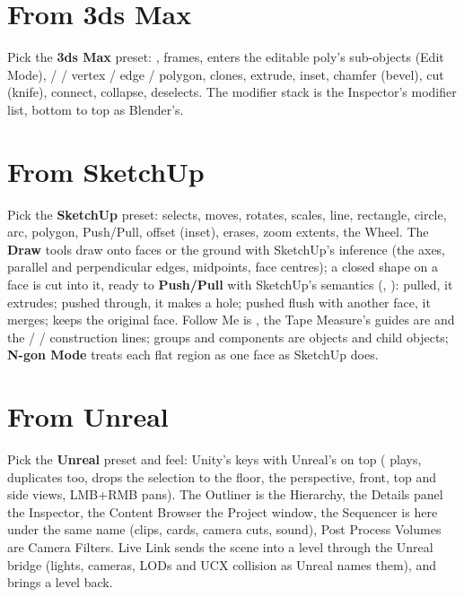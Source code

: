 \section{From 3ds Max}
Pick the \textbf{3ds Max} preset: ,  frames,  enters the editable poly's sub-objects (Edit
Mode),  /  /  vertex / edge / polygon,  clones,  extrude, 
inset,  chamfer (bevel),  cut (knife),  connect, 
collapse,  deselects. The modifier stack is the Inspector's modifier list, bottom to top as Blender's.

\section{From SketchUp}
Pick the \textbf{SketchUp} preset:  selects,  moves,  rotates,  scales,  line,
 rectangle,  circle,  arc,  polygon,  Push/Pull,  offset (inset),
 erases,  zoom extents,  the Wheel. The \textbf{Draw} tools draw onto faces or the
ground with SketchUp's inference (the axes, parallel and perpendicular edges, midpoints, face centres); a closed shape
on a face is cut into it, ready to \textbf{Push/Pull} with SketchUp's semantics (, \cite{SketchUpHelp2026}):
pulled, it extrudes; pushed through, it makes a hole; pushed flush with another face, it merges;  keeps the
original face. Follow Me is , the Tape Measure's guides are  and the  /  / 
construction lines; groups and components are objects and child objects; \textbf{N-gon Mode} treats each flat region
as one face as SketchUp does.

\section{From Unreal}
Pick the \textbf{Unreal} preset and feel: Unity's keys with Unreal's on top ( plays,  duplicates
too,  drops the selection to the floor,  the perspective, front, top and side views, LMB+RMB
pans). The Outliner is the Hierarchy, the Details panel the Inspector, the Content Browser the Project window, the
Sequencer is here under the same name (clips, cards, camera cuts, sound), Post Process Volumes are Camera Filters. Live
Link sends the scene into a level through the Unreal bridge (lights, cameras, LODs and UCX collision as Unreal names
them), and  brings a level back.


